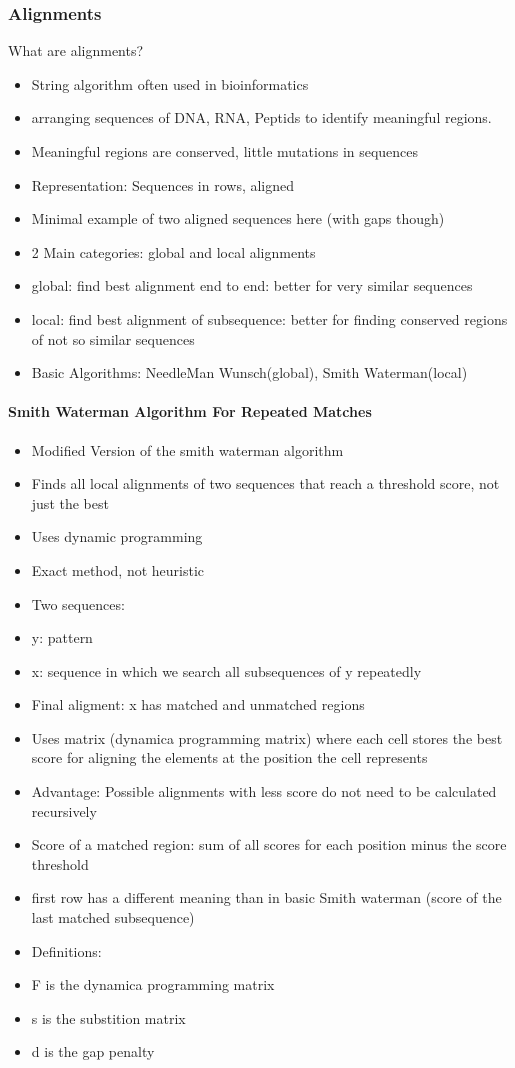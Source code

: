 \subsubsection{Alignments}
What are alignments? 
\begin{itemize}
	\item String algorithm often used in bioinformatics 
	\item arranging sequences of DNA, RNA, Peptids to identify meaningful regions.
	\item Meaningful regions are conserved, little mutations in sequences
	\item Representation: Sequences in rows, aligned 
	\item Minimal example of two aligned sequences here (with gaps though)
	\item 2 Main categories: global and local alignments 
	\item global: find best alignment end to end: better for very similar sequences
	\item local: find best alignment of subsequence: better for finding conserved regions of not so similar sequences
	\item Basic Algorithms: NeedleMan Wunsch(global), Smith Waterman(local) 
\end{itemize} 

\paragraph{Smith Waterman Algorithm For Repeated Matches}
\begin{itemize}
	\item Modified Version of the smith waterman algorithm
	\item Finds all local alignments of two sequences that reach a threshold score, not just the best
	\item Uses dynamic programming
	\item Exact method, not heuristic
	\item Two sequences: 
	\item y: pattern
	\item x: sequence in which we search all subsequences of y repeatedly
	\item Final aligment: x has matched and unmatched regions
	\item Uses matrix (dynamica programming matrix) where each cell stores the best score for aligning the elements at the position the cell represents
	\item Advantage: Possible alignments with less score do not need to be calculated recursively
	\item Score of a matched region: sum of all scores for each position minus the score threshold 
	\item first row has a different meaning than in basic Smith waterman (score of the last matched subsequence)
	\item Definitions:
	\item F is the dynamica programming matrix
	\item s is the substition matrix
	\item d is the gap penalty
\end{itemize}

